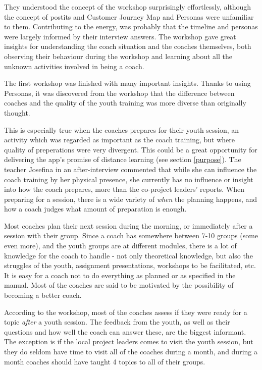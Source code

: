     They understood the concept of the workshop surprisingly effortlessly, although the concept of postits and Customer Journey Map and Personas were unfamiliar to them. Contributing to the energy, was probably that the timeline and personas were largely informed by their interview answers. The workshop gave great insights for understanding the coach situation and the coaches themselves, both observing their behaviour during the workshop and learning about all the unknown activities involved in being a coach.

    The first workshop was finished with many important insights. Thanks to using Personas, it was discovered from the workshop that the difference between coaches and the quality of the youth training was more diverse than originally thought.

    This is especially true when the coaches prepares for their youth session, an activity which was regarded as important as the coach training, but where quality of preperations were very divergent. This could be a great opportunity for delivering the app's promise of distance learning (see section \ref{purpose}). The teacher Josefina in an after-interview commented that while she can influence the coach training by her physical presence, she currently has no influence or insight into how the coach prepares, more than the co-project leaders' reports. When preparing for a session, there is a wide variety of \textit{when} the planning happens, and how a coach judges what amount of preparation is enough.

    Most coaches plan their next session during the morning, or immediately after a session with their group. Since a coach has somewhere between 7-10 groups (some even more), and the youth groups are at different modules, there is a lot of knowledge for the coach to handle - not only theoretical knowledge, but also the struggles of the youth, assignment presentations, workshops to be facilitated, etc. It is easy for a coach not to do everything as planned or as specified in the manual. Most of the coaches are said to be motivated by the possibility of becoming a better coach.

    According to the workshop, most of the coaches assess if they were ready for a topic \textit{after} a youth session. The feedback from the youth, as well as their questions and how well the coach can answer these, are the biggest informant. The exception is if the local project leaders comes to visit the youth session, but they do seldom have time to visit all of the coaches during a month, and during a month coaches should have taught 4 topics to all of their groups.

